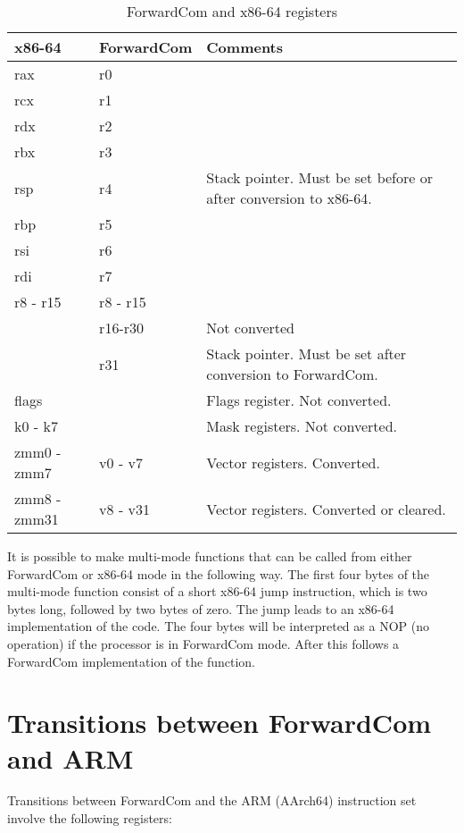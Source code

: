 \documentclass[forwardcom.tex]{subfiles}
\begin{document}
\begin{longtable} {|p{20mm}|p{20mm}|p{80mm}|}
\caption{ForwardCom and x86-64 registers} 
\label{table:ForwardComAndX64Registers}
\\
\endfirsthead
\endhead
\hline
\bfseries x86-64 & \bfseries ForwardCom & \bfseries Comments  \\
\hline
rax & r0 &   \\ 
rcx & r1 &  \\ 
rdx & r2 &  \\ 
rbx & r3 &  \\ 
rsp & r4 & Stack pointer. Must be set before or after conversion to x86-64. \\
rbp & r5 &  \\ 
rsi & r6 &  \\ 
rdi & r7 &  \\ 
r8 - r15 & r8 - r15 &  \\
\hline
 & r16-r30  & Not converted \\
 & r31 & Stack pointer. Must be set after conversion to ForwardCom. \\
\hline
flags &  & Flags register. Not converted. \\
\hline
k0 - k7 &  & Mask registers. Not converted. \\
\hline
zmm0 - zmm7 & v0 - v7 & Vector registers. Converted. \\
zmm8 - zmm31 & v8 - v31 & Vector registers. Converted or cleared. \\
\hline
\end{longtable}

\vspace{2mm}
It is possible to make multi-mode functions that can be called from either ForwardCom or x86-64 mode in the following way. The first four bytes of the multi-mode function consist of a short x86-64 jump instruction, which is two bytes long, followed by two bytes of zero. The jump leads to an x86-64 implementation of the code. The four bytes will be interpreted as a NOP (no operation) if the processor is in ForwardCom mode. After this follows a ForwardCom implementation of the function.


\section{Transitions between ForwardCom and ARM}

Transitions between ForwardCom and the ARM (AArch64) instruction set involve the following registers:
\end{document}

